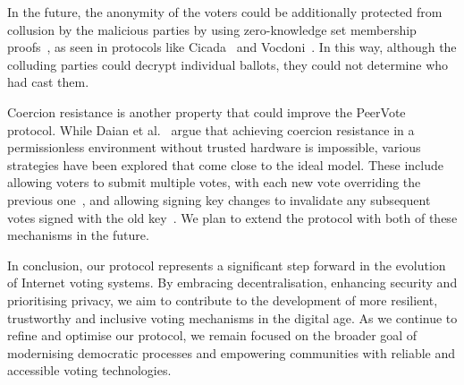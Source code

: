 \documentclass[runningheads]{llncs}
\begin{document}
In the future, the anonymity of the voters could be additionally protected from collusion by the malicious parties by using zero-knowledge set membership proofs~\cite{Semaphorea}, as seen in protocols like Cicada~\cite{BuildingCicadaPrivate} and Vocdoni~\cite{VocdoniIntroductionVocdoni}. In this way, although the colluding parties could decrypt individual ballots, they could not determine who had cast them.

Coercion resistance is another property that could improve the PeerVote protocol. While Daian et al.~\cite{daianOnChainVoteBuying2018} argue that achieving coercion resistance in a permissionless environment without trusted hardware is impossible, various strategies have been explored that come close to the ideal model. These include allowing voters to submit multiple votes, with each new vote overriding the previous one~\cite{VocdoniIntroductionVocdoni}, and allowing signing key changes to invalidate any subsequent votes signed with the old key~\cite{ethereumfoundationMinimalAntiCollusionInfrastructure2022, PrivacyscalingexplorationsMaci2023}. We plan to extend the protocol with both of these mechanisms in the future.

In conclusion, our protocol represents a significant step forward in the evolution of Internet voting systems. By embracing decentralisation, enhancing security and prioritising privacy, we aim to contribute to the development of more resilient, trustworthy and inclusive voting mechanisms in the digital age. As we continue to refine and optimise our protocol, we remain focused on the broader goal of modernising democratic processes and empowering communities with reliable and accessible voting technologies.





\appendix
\end{document}
